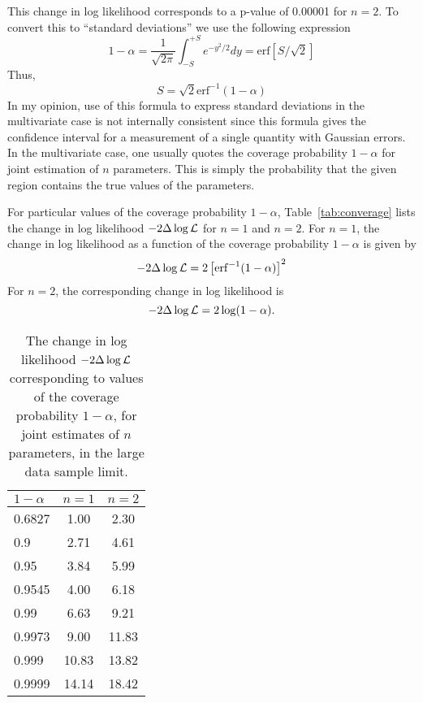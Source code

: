 \documentclass[11pt]{article}
\def\erfinv      {\ensuremath{\mathrm{erf}^{-1}}}
\begin{document}
This change in log likelihood corresponds to a p-value of 0.00001 for $n=2$. To convert this to ``standard deviations'' we use the following expression
\begin{equation}
1-\alpha = \frac{1}{\sqrt{2\pi}}\int_{-S}^{+S}e^{-y^2/2}dy = \mathrm{erf}\left[{S/\sqrt{2}}\right]\label{eq:Srel}
\end{equation}
Thus,
\begin{equation}
S=\sqrt{2}\erfinv(1-\alpha)\label{eq:S}
\end{equation}
In my opinion, use of this formula to express standard deviations in the 
multivariate case is not internally consistent since this formula gives the 
confidence interval for a measurement of a single quantity with Gaussian
errors. In the multivariate case, one usually quotes the coverage probability
$1-\alpha$ for joint estimation of $n$ parameters. This is simply the 
probability that the given region contains the true values of the parameters.
\par
For particular values of the coverage probability $1-\alpha$, 
Table~\ref{tab:converage} lists the change in log likelihood 
$-2\Delta\log{\cal L}$ for $n=1$ and $n=2$. For $n=1$, the change in log 
likelihood as a function of the coverage probability $1-\alpha$ is given by
\begin{equation}
-2\Delta\log{\cal L}=2\left[\erfinv(1-\alpha)\right]^2
\end{equation}
For $n=2$, the corresponding change in log likelihood is
\begin{equation}
-2\Delta\log{\cal L}=2\log(1-\alpha).
\end{equation}
\begin{table}[ph]
  \begin{center}
  \begin{tabular}{l|c|c}\hline\hline
$1-\alpha$ & $n=1$ & $n=2$ \\ \hline
0.6827  & 1.00 & 2.30 \\
0.9     & 2.71 & 4.61 \\
0.95    & 3.84 & 5.99 \\
0.9545  & 4.00 & 6.18 \\
0.99    & 6.63 & 9.21 \\
0.9973  & 9.00 & 11.83 \\
0.999   & 10.83 & 13.82 \\
0.9999  & 14.14 & 18.42 \\ \hline\hline
\end{tabular}
\label{tab:coverage}
\caption{The change in log likelihood $-2\Delta\log{\cal L}$ 
corresponding to values of the coverage 
probability $1-\alpha$, for joint estimates of $n$ parameters, in the large data sample limit.}
  \end{center}
\end{table}
\end{document}
